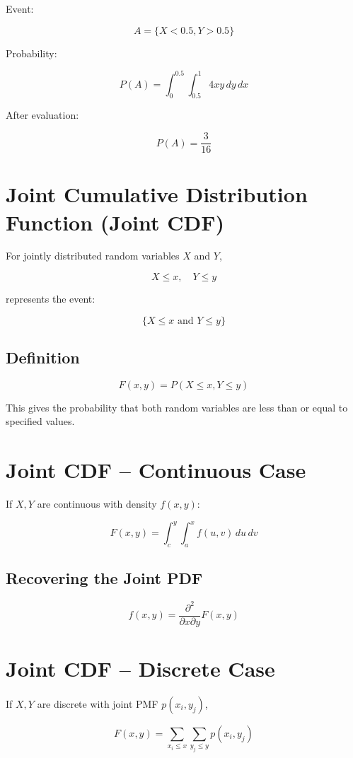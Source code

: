 \documentclass[12pt]{article}
\begin{document}
Event:

\[
A = \{X < 0.5, Y > 0.5\}
\]

Probability:

\[
P(A) = \int_0^{0.5} \int_{0.5}^{1} 4xy\,dy\,dx
\]

After evaluation:

\[
P(A) = \frac{3}{16}
\]

\section{Joint Cumulative Distribution Function (Joint CDF)}

For jointly distributed random variables \(X\) and \(Y\),

\[
X \le x, \quad Y \le y
\]

represents the event:

\[
\{X \le x \text{ and } Y \le y\}
\]

\subsection*{Definition}

\[
F(x,y) = P(X \le x, Y \le y)
\]

This gives the probability that both random variables are less than or equal to specified values.

\section{Joint CDF -- Continuous Case}

If \(X,Y\) are continuous with density \(f(x,y)\):

\[
F(x,y) = \int_c^y \int_a^x f(u,v)\,du\,dv
\]

\subsection*{Recovering the Joint PDF}

\[
f(x,y) = \frac{\partial^2}{\partial x \partial y}F(x,y)
\]

\section{Joint CDF -- Discrete Case}

If \(X,Y\) are discrete with joint PMF \(p(x_i,y_j)\),

\[
F(x,y) = \sum_{x_i \le x}\sum_{y_j \le y} p(x_i,y_j)
\]
\end{document}
